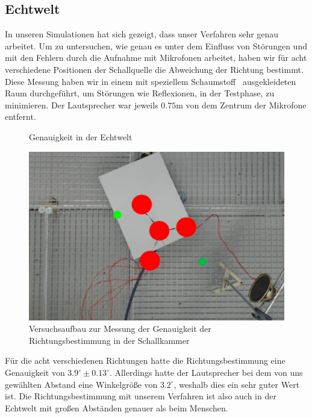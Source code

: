 \subsection{Echtwelt}
In unseren Simulationen hat sich gezeigt, dass unser Verfahren sehr genau arbeitet. Um zu untersuchen, wie genau es unter dem Einfluss von Störungen und mit den Fehlern durch die Aufnahme mit Mikrofonen arbeitet, haben wir für acht verschiedene Positionen der Schallquelle die Abweichung der Richtung bestimmt. Diese Messung haben wir in einem mit speziellem Schaumstoff~\cite{BASOTECT} ausgekleideten Raum durchgeführt, um Störungen wie Reflexionen, in der Testphase, zu minimieren. Der Lautsprecher war jeweils $0.75\mathrm{m}$ von dem Zentrum der Mikrofone entfernt.
\begin{figure}[H]
  \centering
  \resizebox{!}{0.55\textwidth}{}
  \caption{Genauigkeit in der Echtwelt}
  \label{fig:real}
\end{figure}
\begin{figure}[H]
  \centering
  \includegraphics[width=.5\textwidth]{img/pos_1}
  \caption{Versuchsaufbau zur Messung der Genauigkeit der Richtungsbestimmung in der Schallkammer}
  \label{fig:real_reral}
\end{figure}
Für die acht verschiedenen Richtungen hatte die Richtungsbestimmung eine Genauigkeit von $3.9^\circ \pm 0.13^\circ$. Allerdings hatte der Lautsprecher bei dem von uns gewählten Abstand eine Winkelgröße von $3.2^\circ$, weshalb dies ein sehr guter Wert ist. Die Richtungsbestimmung mit unserem Verfahren ist also auch in der Echtwelt mit großen Abständen genauer als beim Menschen.

